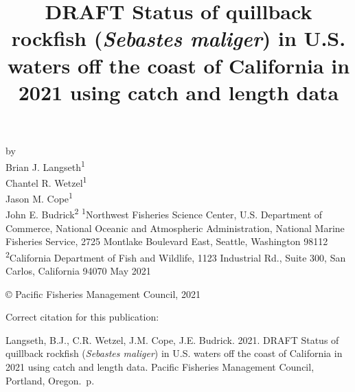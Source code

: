 \documentclass[11pt,
  english,
  a4paper,
]{article}
\date{}
\newcommand{\trTitle}{DRAFT Status of quillback rockfish (\emph{Sebastes maliger}) in U.S. waters off the coast of California in 2021 using catch and length data}
\newcommand{\trYear}{2021}
\newcommand{\trMonth}{May}
\newcommand{\trAuthsBack}{Langseth, B.J., C.R. Wetzel, J.M. Cope, J.E. Budrick}
\newcommand{\trCitation}{
\begin{hangparas}{1em}{1}
\trAuthsBack{}. \trYear{}. \trTitle{}. Pacific Fisheries Management Council, Portland, Oregon. \pageref{LastPage}{}\,p.
\end{hangparas}}
\begin{document}

\renewcommand*{\thefootnote}{\fnsymbol{footnote}}

\small
\thispagestyle{empty}
\noindent
\begin{center}
\title{DRAFT Status of quillback rockfish (\emph{Sebastes maliger}) in U.S. waters off the coast of California in 2021 using catch and length data}
\vspace{1.5cm}
{\Large\textbf{}}
\vfill
by\\
Brian J. Langseth\textsuperscript{1}\\
Chantel R. Wetzel\textsuperscript{1}\\
Jason M. Cope\textsuperscript{1}\\
John E. Budrick\textsuperscript{2}\vfill
\textsuperscript{1}Northwest Fisheries Science Center, U.S. Department of Commerce, National Oceanic and Atmospheric Administration, National Marine Fisheries Service, 2725 Montlake Boulevard East, Seattle, Washington 98112\\
\textsuperscript{2}California Department of Fish and Wildlife, 1123 Industrial Rd., Suite 300, San Carlos, California 94070\vfill
\trMonth{} \trYear{}
\end{center}
\clearpage

\thispagestyle{empty}
\vspace*{\fill}
\begin{center}
\copyright{} Pacific Fisheries Management Council, \trYear{}\\
\end{center}
\par
\bigskip
\noindent
Correct citation for this publication:
\bigskip
\par
\trCitation{}
\clearpage


\tableofcontents\clearpage
\label{TRlastRoman}
\clearpage

\newpage
\thispagestyle{empty} %

\pagestyle{plain}  %
\renewcommand*{\thefootnote}{\arabic{footnote}}  %
\setcounter{footnote}{0}  %
\renewcommand{\headrulewidth}{0.5pt}
\renewcommand{\footrulewidth}{0.5pt}
\end{document}
